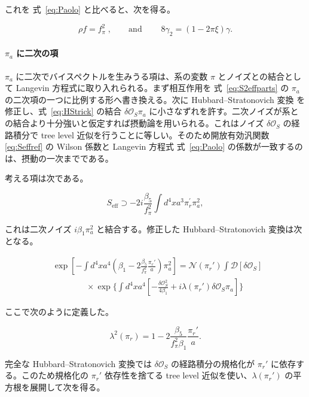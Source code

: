 \documentclass[a4paper,11pt]{ltjsarticle}
\numberwithin{equation}{section}
\def\pia{\pi_{a}}
\def\pir{\pi_{r}}
\newcommand{\Os}{\delta \mathcal{O}_{S}}
\newcommand{\Eq}[1]{Eq.~(\ref{#1})}
\renewcommand{\Eq}[1]{式~\eqref{#1}}
\begin{document}
これを \Eq{eq:Paolo} と比べると、次を得る。

\begin{equation}
\rho f=f_{\pi}^{2}\;,\qquad \mathrm{and}\qquad \;8\gamma_2 =\left(1-2 \pi \xi\right) \gamma.
\end{equation}

\paragraph{$\pia$ に二次の項} $\pia$ に二次でバイスペクトルを生みうる項は、系の変数 $\pi$ とノイズとの結合として Langevin 方程式に取り入れられる。まず相互作用を \Eq{eq:S2effparts} の $\pia$ の二次項の一つに比例する形へ書き換える。次に Hubbard--Stratonovich 変換 \cite{Stratonovich1957,Hubbard1959} を修正し、\Eq{eq:HStrick} の結合 $\Os\pia$ に小さなずれを許す。二次ノイズが系との結合より十分強いと仮定すれば摂動論を用いられる。これはノイズ $\Os$ の経路積分で tree level 近似を行うことに等しい。そのため開放有効汎関数 \eqref{eq:Seffref} の Wilson 係数と Langevin 方程式 \Eq{eq:Paolo} の係数が一致するのは、摂動の一次までである。

考える項は次である。

\begin{equation}
S_{\text{eff}}\supset - 2i\frac{\beta_{5}}{f_\pi^2}  \int d^{4}x a^3 \pir^{\prime} \pia^2,
\end{equation}

これは二次ノイズ $i\beta_1\pia^2$ と結合する。修正した Hubbard--Stratonovich 変換は次となる。

\begin{align}
&\exp\left[-\int d^{4}x a^{4}\left(\beta_{1}-2 \frac{\beta_{5}}{f_\pi^2}  \frac{\pir'}{a}\right)\pia^{2}\right]=
\mathcal{N}(\pir')\int\mathcal{D}[\Os]\;\\
&\qquad \qquad \times \exp\Bigg\{\int d^{4}x a^{4}\left[-\frac{\Os^{2}}{4\beta_{1}}+i\lambda(\pir')\Os\pia\right]\Bigg\}\nonumber
\end{align}

ここで次のように定義した。

\begin{equation}
\lambda^{2}(\pir)=1-2\frac{\beta_{5}}{f_\pi^2 \beta_{1}} \frac{\pir'}{a}.
\end{equation}

完全な Hubbard--Stratonovich 変換では $\Os$ の経路積分の規格化が $\pir'$ に依存する。このため規格化の $\pir'$ 依存性を捨てる tree level 近似を使い、$\lambda(\pir')$ の平方根を展開して次を得る。
\end{document}
